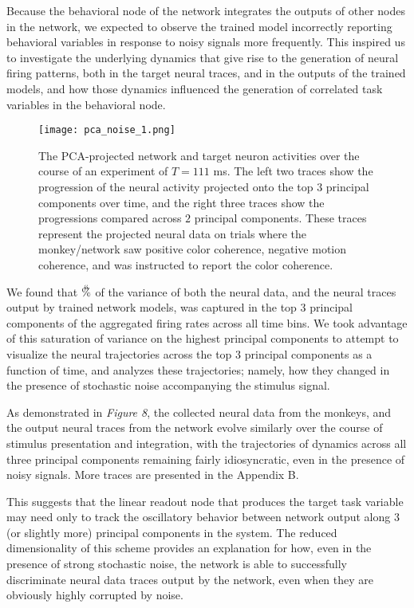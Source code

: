 \documentclass[12pt,a4paper,final]{iopart}
\begin{document}
Because the behavioral node of the network integrates the outputs of other nodes in the network, we expected to observe the trained model incorrectly reporting behavioral variables in response to noisy signals more frequently. This inspired us to investigate the underlying dynamics that give rise to the generation of neural firing patterns, both in the target neural traces, and in the outputs of the trained models, and how those dynamics influenced the generation of correlated task variables in the behavioral node. 
\begin{figure}[t]
 \centering
 \texttt{[image: pca\_noise\_1.png]}
 \caption{The PCA-projected network and target neuron activities over the course of an experiment of $T = 111$ ms. The left two traces show the progression of the neural activity projected onto the top $3$ principal components over time, and the right three traces show the progressions compared across $2$ principal components. These traces represent the projected neural data on trials where the monkey/network saw positive color coherence, negative motion coherence, and was instructed to report the color coherence.}
\end{figure}

We found that $\mathaccent92\%$ of the variance of both the neural data, and the neural traces output by trained network models, was captured in the top $3$ principal components of the aggregated firing rates across all time bins. We took advantage of this saturation of variance on the highest principal components to attempt to visualize the neural trajectories across the top $3$ principal components as a function of time, and analyzes these trajectories; namely, how they changed in the presence of stochastic noise accompanying the stimulus signal.

As demonstrated in \emph{Figure 8}, the collected neural data from the monkeys, and the output neural traces from the network evolve similarly over the course of stimulus presentation and integration, with the trajectories of dynamics across all three principal components remaining fairly idiosyncratic, even in the presence of noisy signals. More traces are presented in the Appendix B.

This suggests that the linear readout node that produces the target task variable may need only to track the oscillatory behavior between network output along $3$ (or slightly more) principal components in the system. The reduced dimensionality of this scheme provides an explanation for how, even in the presence of strong stochastic noise, the network is able to successfully discriminate neural data traces output by the network, even when they are obviously highly corrupted by noise.
\end{document}

